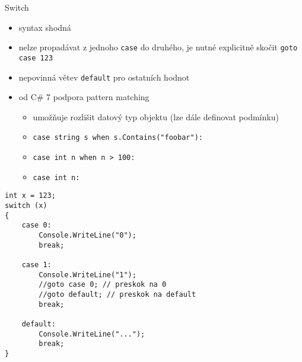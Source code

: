 \begin{frame}[fragile]
\begin{block}{Switch}
\begin{itemize}
\item syntax shodná
\item nelze propadávat z jednoho \lstinline|case| do druhého, je nutné explicitně skočit \lstinline|goto case 123|
\item nepovinná větev \lstinline|default| pro ostatních hodnot
\end{itemize}
\end{block}

\begin{bonusblock}{}
\begin{itemize}
\item od C\# 7 podpora pattern matching
\begin{itemize}
\item umožňuje rozlišit datový typ objektu (lze dále definovat podmínku)
\item \lstinline|case string s when s.Contains("foobar"):|
\item \lstinline|case int n when n > 100:|
\item \lstinline|case int n:|
\end{itemize}
\end{itemize}
\end{bonusblock}
\end{frame}





\begin{frame}[fragile]
\begin{yesblock}
\begin{lstlisting}
int x = 123;
switch (x)
{
    case 0: 
        Console.WriteLine("0");
        break;

    case 1:
        Console.WriteLine("1");
        //goto case 0; // preskok na 0
        //goto default; // preskok na default
        break;

    default:
        Console.WriteLine("...");
        break;
}
\end{lstlisting}
\end{yesblock}
\end{frame}






